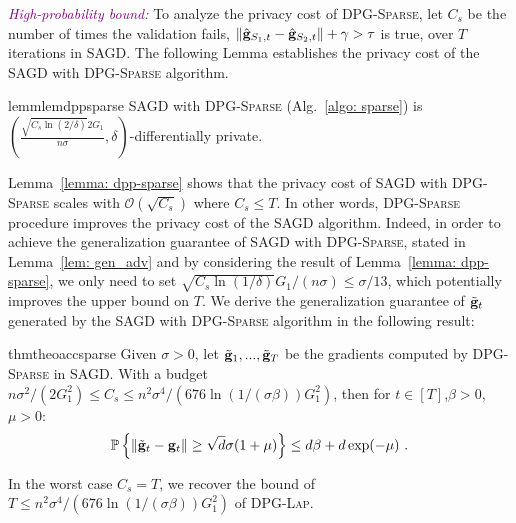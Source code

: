 \documentclass[11pt]{article}
\begin{document}
\textcolor{purple}{\textit{High-probability bound:}}
To analyze the privacy cost of \textsc{DPG-Sparse}, let $C_{s}$ be the number of times the validation fails, \ie $\| \hat {\mathbf{g}}_{S_1,t} - \hat {\mathbf{g}}_{S_2,t}\| + \gamma >  \tau$ is true, over $T$ iterations in \textsc{SAGD}. The following Lemma establishes the privacy cost of the \textsc{SAGD} with \textsc{DPG-Sparse} algorithm.
\begin{restatable}{lemm}{lemdppsparse}
\label{lemma: dpp-sparse}
\textsc{SAGD} with \textsc{DPG-Sparse}  (Alg.~\ref{algo: sparse}) is  
$(\frac{\sqrt{C_{s} \ln(2/\delta)} 2G_1}{n\sigma}, \delta)$-differentially private. 
\end{restatable}
Lemma~\ref{lemma: dpp-sparse} shows that the privacy cost of  \textsc{SAGD} with \textsc{DPG-Sparse} scales with $\mathcal{O}(\sqrt{C_{s}})$ where $C_{s} \leq T$. 
In other words, \textsc{DPG-Sparse} procedure improves the privacy cost of the \textsc{SAGD} algorithm. 
Indeed, in order to achieve the generalization guarantee of \textsc{SAGD} with \textsc{DPG-Sparse}, stated in Lemma~\ref{lem: gen_adv} and  by considering the result of Lemma~\ref{lemma: dpp-sparse},  we only need to set $\sqrt{C_{s} \ln(1/\delta)} G_1/(n\sigma) \leq \sigma/13$, which potentially improves the upper bound on $T$. 
We derive the generalization guarantee of $\tilde {\mathbf{g}}_t$ generated by the \textsc{SAGD} with \textsc{DPG-Sparse} algorithm in the following result:
\begin{restatable}{thm}{theoaccsparse}
\label{thm: acc_sparse}
Given $\sigma > 0$, let $\tilde {\mathbf{g}}_1,...,  \tilde {\mathbf{g}}_T$ be the gradients computed by \textsc{DPG-Sparse} in \textsc{SAGD}. With a budget $ n\sigma^2/(2G_1^2) \leq C_{s} \leq n^2 \sigma^4/(676 \ln(1/(\sigma \beta))G_1^2)$, then for $t \in [T]$,$\beta > 0$, $\mu > 0$:
        \begin{equation*}
    \mathbb{P}\left\{\|\tilde {\mathbf{g}}_t - \mathbf{g}_t\| \geq \sqrt{d}\sigma(1+\mu)\right\} \leq d\beta + d\exp(-\mu)~.
    \end{equation*}
\end{restatable}
In the worst case $C_{s} = T$, we recover the bound of $T \leq n^2 \sigma^4/(676 \ln(1/(\sigma \beta))G_1^2)$ of \textsc{DPG-Lap}.
\end{document}
